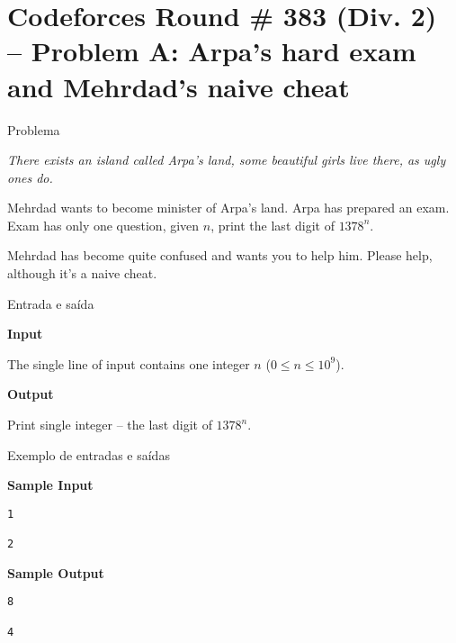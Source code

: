 \section{Codeforces Round \# 383 (Div. 2) -- Problem A: Arpa's hard exam and Mehrdad's naive cheat}

\begin{frame}[fragile]{Problema}

\textit{There exists an island called Arpa’s land, some beautiful girls live there, as ugly ones 
do.}

Mehrdad wants to become minister of Arpa’s land. Arpa has prepared an exam. Exam has only one question, given $n$, print the last digit of $1378^n$.

Mehrdad has become quite confused and wants you to help him. Please help, although it's a naive cheat.

\end{frame}

\begin{frame}[fragile]{Entrada e saída}

\textbf{Input}

The single line of input contains one integer $n$ ($0\leq n\leq 10^9$).

\textbf{Output}

Print single integer -- the last digit of $1378^n$.

\end{frame}

\begin{frame}[fragile]{Exemplo de entradas e saídas}

\begin{minipage}[t]{0.45\textwidth}
\textbf{Sample Input}
\begin{verbatim}
1

2
\end{verbatim}
\end{minipage}
\begin{minipage}[t]{0.5\textwidth}
\textbf{Sample Output}
\begin{verbatim}
8

4
\end{verbatim}
\end{minipage}
\end{frame}

